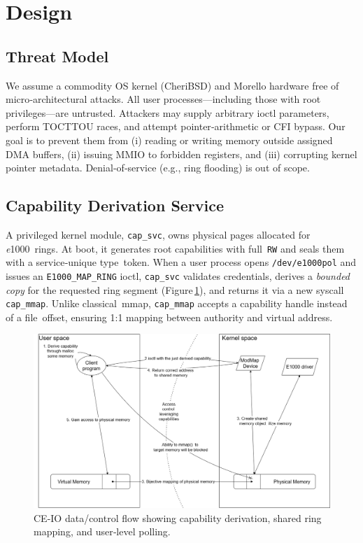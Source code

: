 \documentclass[sigconf]{acmart}
\newcommand{\e}{\textit{e}1000\xspace}
\begin{document}
\section{Design}
\label{sec:design}
\subsection{Threat Model}
We assume a commodity OS kernel (CheriBSD) and Morello hardware free of micro‑architectural attacks. All user processes—including those with root privileges—are untrusted. Attackers may supply arbitrary ioctl parameters, perform TOCTTOU races, and attempt pointer‑arithmetic or CFI bypass. Our goal is to prevent them from (i) reading or writing memory outside assigned DMA buffers, (ii) issuing MMIO to forbidden registers, and (iii) corrupting kernel pointer metadata. Denial‑of‑service (e.g., ring flooding) is out of scope.

\subsection{Capability Derivation Service}
A privileged kernel module, \texttt{cap\_svc}, owns physical pages allocated for \e rings. At boot, it generates root capabilities with full \texttt{RW} and seals them with a service‑unique type token. When a user process opens \texttt{/dev/e1000pol} and issues an \texttt{E1000\_MAP\_RING} ioctl, \texttt{cap\_svc} validates credentials, derives a \emph{bounded copy} for the requested ring segment (Figure\,\ref{fig:flow}), and returns it via a new syscall \texttt{cap\_mmap}. Unlike classical mmap, \texttt{cap\_mmap} accepts a capability handle instead of a file offset, ensuring 1:1 mapping between authority and virtual address.  

\begin{figure}[t]
    \centering
    \includegraphics[width=0.9\columnwidth]{figures/general flowpng.png}
    \caption{CE-IO data/control flow showing capability derivation, shared ring mapping, and user‑level polling.}
    \label{fig:flow}
\end{figure}
\end{document}
